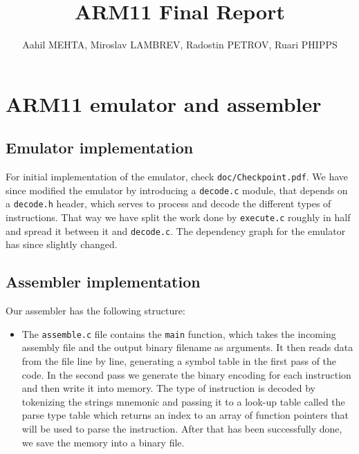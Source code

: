 \documentclass[11pt]{article}
\begin{document}
\title{\vspace{-1.5\baselineskip}ARM11 Final Report}

\author{Aahil MEHTA, Miroslav LAMBREV, Radostin PETROV, Ruari PHIPPS}

\maketitle

\section{ARM11 emulator and assembler}
\begin{minipage}{0.6\linewidth}
\subsection{Emulator implementation}

For initial implementation of the emulator, check \texttt{doc/Checkpoint.pdf}. We have since modified the emulator by introducing a \texttt{decode.c} module, that depends on a \texttt{decode.h} header, which serves to process and decode the different types of instructions. That way we have split the work done by \texttt{execute.c} roughly in half and spread it between it and \texttt{decode.c}. The dependency graph for the emulator has since slightly changed.

\subsection{Assembler implementation}

Our assembler has the following structure:
\begin{itemize}
    \item The \texttt{assemble.c} file contains the \texttt{main} function, which takes the incoming assembly file and the output binary filename as arguments. It then reads data from the file line by line, generating a symbol table in the first pass of the code. In the second pass we generate the binary encoding for each instruction and then write it into memory. The type of instruction is decoded by tokenizing the strings mnemonic and passing it to a look-up table called the parse type table which returns an index to an array of function pointers that will be used to parse the instruction. After that has been successfully done, we save the memory into a binary file.
    \end{itemize}
    \end{minipage}
\end{document}
